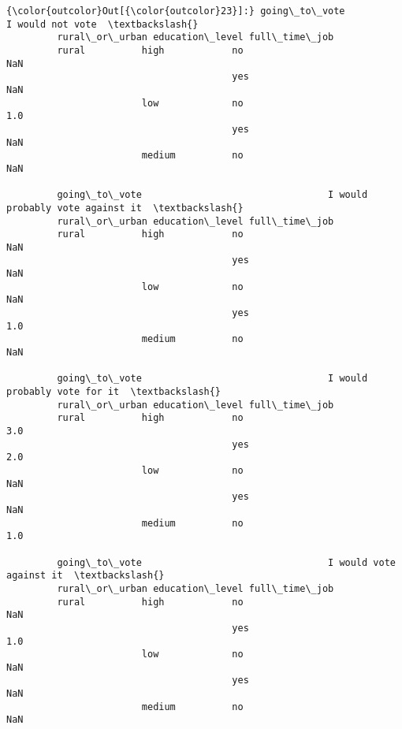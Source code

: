 \documentclass[11pt]{article}
\begin{document}
\begin{Verbatim}[commandchars=\\\{\}]
{\color{outcolor}Out[{\color{outcolor}23}]:} going\_to\_vote                                 I would not vote  \textbackslash{}
         rural\_or\_urban education\_level full\_time\_job                     
         rural          high            no                          NaN   
                                        yes                         NaN   
                        low             no                          1.0   
                                        yes                         NaN   
                        medium          no                          NaN   
         
         going\_to\_vote                                 I would probably vote against it  \textbackslash{}
         rural\_or\_urban education\_level full\_time\_job                                     
         rural          high            no                                          NaN   
                                        yes                                         NaN   
                        low             no                                          NaN   
                                        yes                                         1.0   
                        medium          no                                          NaN   
         
         going\_to\_vote                                 I would probably vote for it  \textbackslash{}
         rural\_or\_urban education\_level full\_time\_job                                 
         rural          high            no                                      3.0   
                                        yes                                     2.0   
                        low             no                                      NaN   
                                        yes                                     NaN   
                        medium          no                                      1.0   
         
         going\_to\_vote                                 I would vote against it  \textbackslash{}
         rural\_or\_urban education\_level full\_time\_job                            
         rural          high            no                                 NaN   
                                        yes                                1.0   
                        low             no                                 NaN   
                                        yes                                NaN   
                        medium          no                                 NaN   
         

\end{Verbatim}
\end{document}
